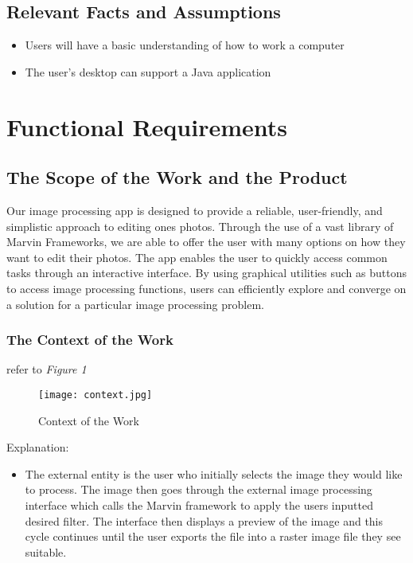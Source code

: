 \documentclass[12pt, titlepage]{article}
\begin{document}
\subsection{Relevant Facts and Assumptions}

\begin{itemize}
  \item Users will have a basic understanding of how to work a computer
  \item The user's desktop can support a Java application
\end{itemize}


\newpage

\section{Functional Requirements}


\subsection{The Scope of the Work and the Product}

Our image processing app is designed to provide a reliable, user-friendly, and simplistic approach to editing ones photos. Through the use of a vast library of Marvin Frameworks, we are able to offer the user with many options on how they want to edit their photos. The app enables the user to quickly access common tasks through an interactive interface. By using graphical utilities such as buttons to access image processing functions, users can efficiently explore and converge on a solution for a particular image processing problem.

\subsubsection{The Context of the Work}
refer to \textit{Figure 1}

\begin{figure}[h]
	\texttt{[image: context.jpg]}
	\caption{Context of the Work}
	\end{figure}
	
Explanation: \\

\begin{itemize}
	\item The external entity is the user who initially selects the image they would like to process. The image then goes through the external image processing interface which calls the Marvin framework to apply the users inputted desired filter. The interface then displays a preview of the image and this cycle continues until the user exports the file into a raster image file they see suitable.
\end{itemize}
\end{document}
